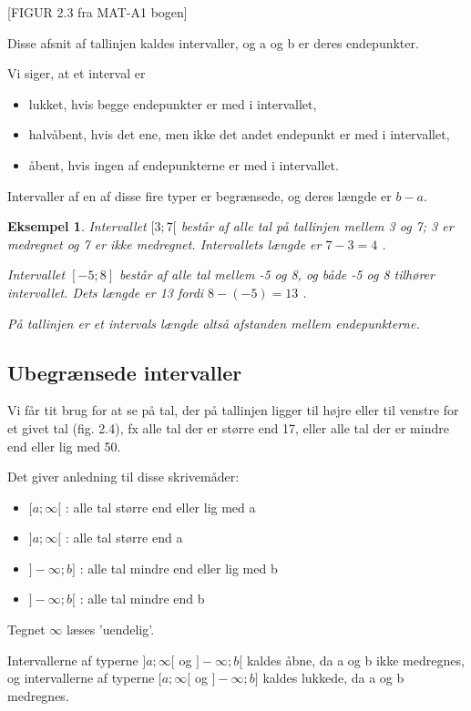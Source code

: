 \documentclass[12pt,oneside,a4paper]{article}
\newtheorem{eks}[thm]{Eksempel}
\begin{document}
[FIGUR 2.3 fra MAT-A1 bogen]

Disse afsnit af tallinjen kaldes intervaller, og a og b er deres endepunkter.

Vi siger, at et interval er
\begin{itemize}
    \item lukket, hvis begge endepunkter er med i intervallet,
    \item halvåbent, hvis det ene, men ikke det andet endepunkt er med i intervallet,
    \item åbent, hvis ingen af endepunkterne er med i intervallet.
\end{itemize}
Intervaller af en af disse fire typer er begrænsede, og deres længde er $b-a$.

\begin{eks}
Intervallet $[3;7[$ består af alle tal på tallinjen mellem 3 og 7; 3 er
medregnet og 7 er ikke medregnet. Intervallets længde er $7-3 = 4$ .

Intervallet $[-5;8]$ består af alle tal mellem -5 og 8, og både -5 og 8
tilhører intervallet. Dets længde er 13 fordi $8 - (-5) = 13$ .

På tallinjen er et intervals længde altså afstanden mellem endepunkterne.
\end{eks}

\subsection{Ubegrænsede intervaller}
Vi får tit brug for at se på tal, der på tallinjen ligger til højre eller til
venstre for et givet tal (fig. 2.4), fx alle tal der er større end 17, eller
alle tal der er mindre end eller lig med 50.

Det giver anledning til disse skrivemåder:

\begin{itemize}
    \item $[a;\infty[$  : alle tal større end eller lig med a
    \item $]a;\infty[$  : alle tal større end a
    \item $]-\infty;b]$ : alle tal mindre end eller lig med b
    \item $]-\infty;b[$ : alle tal mindre end b
\end{itemize}
Tegnet $\infty$ læses ’uendelig’.

Intervallerne af typerne $]a;\infty [$ og $]-\infty ;b[$ kaldes åbne, da a og b
ikke medregnes, og intervallerne af typerne $[a;\infty [$ og $]-\infty ;b]$
kaldes lukkede, da a og b medregnes.
\end{document}
